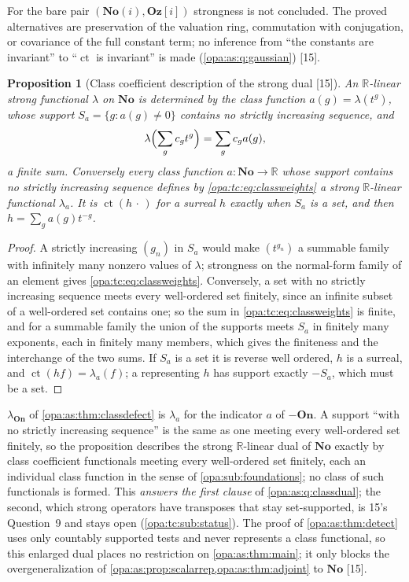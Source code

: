 \documentclass[11pt,oneside]{article}
\numberwithin{equation}{section}
\newtheorem{proposition}[proposition]{Proposition}
\theoremstyle{definition}
\theoremstyle{remark}
\newcommand{\No}{\mathbf{No}}
\newcommand{\Og}{\mathbf{Oz}[i]}
\newcommand{\SC}{\mathbf{No}(i)}
\newcommand{\R}{\mathbb R}
\newcommand{\ct}{\operatorname{ct}}
\newcommand{\src}[1]{\textup{\textsf{\small[#1]}}}
\newcommand{\On}{\mathbf{On}}
\begin{document}
For the bare pair $(\SC,\Og)$ strongness is not concluded. The proved alternatives are preservation of the
valuation ring, commutation with conjugation, or covariance of the full constant term; no inference from
``the constants are invariant'' to ``$\ct$ is invariant'' is made (\cref{opa:as:q:gaussian}) \src{15}.

\begin{proposition}[Class coefficient description of the strong dual \src{15}]\label{opa:tc:prop:classweights}
An $\R$-linear strong functional $\lambda$ on $\No$ is determined by the class function
$a(g)=\lambda(t^g)$, whose support $S_a=\{g:a(g)\ne0\}$ contains no strictly increasing sequence, and
\begin{equation}\label{opa:tc:eq:classweights}
 \lambda\Bigl(\sum_gc_gt^g\Bigr)=\sum_gc_ga(g),
\end{equation}
a finite sum. Conversely every class function $a:\No\to\R$ whose support contains no strictly increasing
sequence defines by \eqref{opa:tc:eq:classweights} a strong $\R$-linear functional $\lambda_a$. It is
$\ct(h\,\cdot\,)$ for a surreal $h$ exactly when $S_a$ is a set, and then $h=\sum_ga(g)t^{-g}$.
\end{proposition}
\begin{proof}
A strictly increasing $(g_n)$ in $S_a$ would make $(t^{g_n})$ a summable family with infinitely many nonzero
values of $\lambda$; strongness on the normal-form family of an element gives
\eqref{opa:tc:eq:classweights}. Conversely, a set with no strictly increasing sequence meets every well-ordered
set finitely, since an infinite subset of a well-ordered set contains one; so the sum in
\eqref{opa:tc:eq:classweights} is finite, and for a summable family the union of the supports meets $S_a$ in
finitely many exponents, each in finitely many members, which gives the finiteness and the interchange of
the two sums. If $S_a$ is a set it is reverse well ordered, $h$ is a surreal, and $\ct(hf)=\lambda_a(f)$; a
representing $h$ has support exactly $-S_a$, which must be a set.
\end{proof}

$\lambda_{\On}$ of \cref{opa:as:thm:classdefect} is $\lambda_a$ for the indicator $a$ of $-\On$. A support ``with
no strictly increasing sequence'' is the same as one meeting every well-ordered set finitely, so the
proposition describes the strong $\R$-linear dual of $\No$ exactly by class coefficient functionals meeting
every well-ordered set finitely, each an individual class function in the sense of
\cref{opa:sub:foundations}; no class of such functionals is formed. This \emph{answers the first clause} of
\cref{opa:as:q:classdual}; the second, which strong operators have transposes that stay set-supported, is 15's
Question~9 and stays open (\cref{opa:tc:sub:status}). The proof of \cref{opa:as:thm:detect} uses only countably
supported tests and never represents a class functional, so this enlarged dual places no restriction on
\cref{opa:as:thm:main}; it only blocks the overgeneralization of \cref{opa:as:prop:scalarrep,opa:as:thm:adjoint}
to $\No$ \src{15}.
\end{document}
